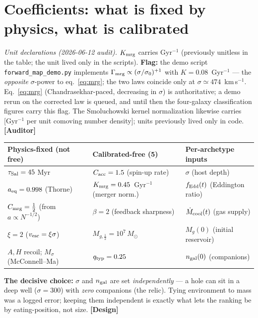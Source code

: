 \documentclass[11pt]{article}
\newcommand{\Design}{\textbf{\textcolor{purple!65!black}{[Design]}}}
\newcommand{\Auditor}{\textbf{\textcolor{teal!55!black}{[Auditor]}}}
\newcommand{\msun}{M_\odot}
\newcommand{\Msig}{M_\sigma}
\begin{document}
\section{Coefficients: what is fixed by physics, what is calibrated}
\noindent\emph{Unit declarations (2026-06-12 audit).} $K_{\rm mrg}$ carries Gyr$^{-1}$ (previously unitless in the table; the unit lived only in the scripts). \textbf{Flag:} the demo script \texttt{forward\_map\_demo.py} implements $\Gamma_{\rm mrg}\propto(\sigma/\sigma_0)^{+1}$ with $K=0.08$~Gyr$^{-1}$ --- the \emph{opposite} $\sigma$-power to eq.~\eqref{eq:mrg}; the two laws coincide only at $\sigma\simeq474$~km\,s$^{-1}$. Eq.~\eqref{eq:mrg} (Chandrasekhar-paced, decreasing in $\sigma$) is authoritative; a demo rerun on the corrected law is queued, and until then the four-galaxy classification figures carry this flag. The Smoluchowski kernel normalization likewise carries [Gyr$^{-1}$ per unit comoving number density]; units previously lived only in code. \Auditor

\begin{center}\small
\begin{tabular}{@{}lll@{}}
\toprule
\textbf{Physics-fixed (not free)} & \textbf{Calibrated-free (5)} & \textbf{Per-archetype inputs} \\
\midrule
$\tau_{\rm Sal}=45$ Myr & $C_{\rm acc}=1.5$ (spin-up rate) & $\sigma$ (host depth) \\
$a_{\rm eq}=0.998$ (Thorne) & $K_{\rm mrg}=0.45$~Gyr$^{-1}$ (merger norm.) & $f_{\rm Edd}(t)$ (Eddington ratio) \\
$C_{\rm mrg}=\tfrac12$ (from $a\!\propto\!N^{-1/2}$) & $\beta=2$ (feedback sharpness) & $\dot M_{\rm cool}(t)$ (gas supply) \\
$\xi=2$ ($v_{\rm esc}=\xi\sigma$) & $M_{g,\frac12}=10^{7}\,\msun$ & $M_g(0)$ (initial reservoir) \\
$A,H$ recoil; $\Msig$ (McConnell--Ma) & $q_{\rm typ}=0.25$ & $n_{\rm gal}(0)$ (companions) \\
\bottomrule
\end{tabular}
\end{center}
\textbf{The decisive choice:} $\sigma$ and $n_{\rm gal}$ are set \emph{independently} --- a hole can sit in a deep well ($\sigma=300$) with \emph{zero} companions (the relic). Tying environment to mass was a logged error; keeping them independent is exactly what lets the ranking be by eating-position, not size. \Design
\end{document}
